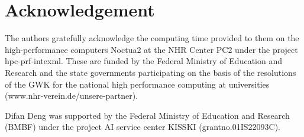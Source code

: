 \section{Acknowledgement}
The authors gratefully acknowledge the computing time provided to them on the high-performance computers Noctua2 at the NHR Center PC2 under the project hpc-prf-intexml. These are funded by the Federal Ministry of Education and Research and the state governments participating on the basis of the resolutions of the GWK for the national high performance computing at universities (www.nhr-verein.de/unsere-partner).

Difan Deng was supported by the Federal Ministry of Education and Research (BMBF) under the project AI service center KISSKI (grantno.01IS22093C).

